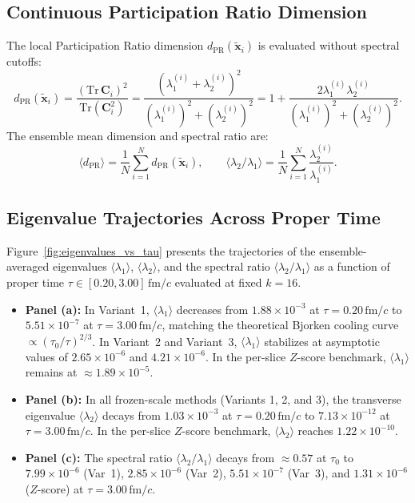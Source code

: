 \documentclass[11pt,a4paper]{article}
\begin{document}
\subsection{Continuous Participation Ratio Dimension}
The local Participation Ratio dimension $d_{\mathrm{PR}}(\tilde{\mathbf{x}}_i)$ is evaluated without spectral cutoffs:
\begin{equation}
    d_{\mathrm{PR}}(\tilde{\mathbf{x}}_i) = \frac{\left(\mathrm{Tr}\,\mathbf{C}_i\right)^2}{\mathrm{Tr}\left(\mathbf{C}_i^2\right)} = \frac{\left(\lambda_1^{(i)} + \lambda_2^{(i)}\right)^2}{\left(\lambda_1^{(i)}\right)^2 + \left(\lambda_2^{(i)}\right)^2} = 1 + \frac{2\lambda_1^{(i)}\lambda_2^{(i)}}{\left(\lambda_1^{(i)}\right)^2 + \left(\lambda_2^{(i)}\right)^2}.
    \label{eq:dpr_def}
\end{equation}
The ensemble mean dimension and spectral ratio are:
\begin{equation}
    \langle d_{\mathrm{PR}} \rangle = \frac{1}{N}\sum_{i=1}^N d_{\mathrm{PR}}(\tilde{\mathbf{x}}_i), \qquad \langle \lambda_2 / \lambda_1 \rangle = \frac{1}{N}\sum_{i=1}^N \frac{\lambda_2^{(i)}}{\lambda_1^{(i)}}.
\end{equation}

\subsection{Eigenvalue Trajectories Across Proper Time}
Figure~\ref{fig:eigenvalues_vs_tau} presents the trajectories of the ensemble-averaged eigenvalues $\langle \lambda_1 \rangle$, $\langle \lambda_2 \rangle$, and the spectral ratio $\langle \lambda_2 / \lambda_1 \rangle$ as a function of proper time $\tau \in [0.20, 3.00]\,\mathrm{fm}/c$ evaluated at fixed $k = 16$.
\begin{itemize}
    \item \textbf{Panel (a):} In Variant~1, $\langle \lambda_1 \rangle$ decreases from $1.88 \times 10^{-3}$ at $\tau = 0.20\,\mathrm{fm}/c$ to $5.51 \times 10^{-7}$ at $\tau = 3.00\,\mathrm{fm}/c$, matching the theoretical Bjorken cooling curve $\propto (\tau_0/\tau)^{2/3}$. In Variant~2 and Variant~3, $\langle \lambda_1 \rangle$ stabilizes at asymptotic values of $2.65 \times 10^{-6}$ and $4.21 \times 10^{-6}$. In the per-slice $Z$-score benchmark, $\langle \lambda_1 \rangle$ remains at $\approx 1.89 \times 10^{-5}$.
    \item \textbf{Panel (b):} In all frozen-scale methods (Variants 1, 2, and 3), the transverse eigenvalue $\langle \lambda_2 \rangle$ decays from $1.03 \times 10^{-3}$ at $\tau = 0.20\,\mathrm{fm}/c$ to $7.13 \times 10^{-12}$ at $\tau = 3.00\,\mathrm{fm}/c$. In the per-slice $Z$-score benchmark, $\langle \lambda_2 \rangle$ reaches $1.22 \times 10^{-10}$.
    \item \textbf{Panel (c):} The spectral ratio $\langle \lambda_2 / \lambda_1 \rangle$ decays from $\approx 0.57$ at $\tau_0$ to $7.99 \times 10^{-6}$ (Var~1), $2.85 \times 10^{-6}$ (Var~2), $5.51 \times 10^{-7}$ (Var~3), and $1.31 \times 10^{-6}$ ($Z$-score) at $\tau = 3.00\,\mathrm{fm}/c$.
\end{itemize}
\end{document}
